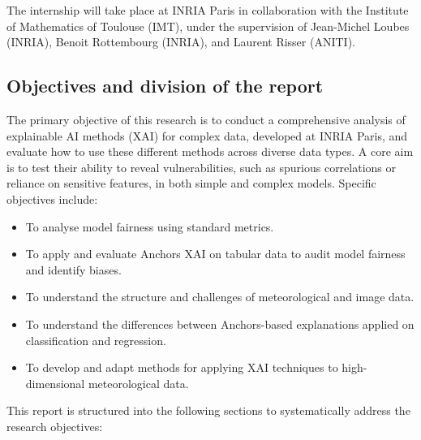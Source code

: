The internship will take place at INRIA Paris in collaboration with the Institute of Mathematics of Toulouse (IMT), under the supervision of Jean-Michel Loubes (INRIA), Benoit Rottembourg (INRIA), and Laurent Risser (ANITI).

\subsection{Objectives and division of the report}

The primary objective of this research is to conduct a comprehensive analysis of explainable AI methods (XAI) for complex data, developed at INRIA Paris, and evaluate how to use these different methods across diverse data types. A core aim is to test their ability to reveal vulnerabilities, such as spurious correlations or reliance on sensitive features, in both simple and complex models. Specific objectives include:

\begin{itemize}
    \item To analyse model fairness using standard metrics.
    \item To apply and evaluate Anchors XAI on tabular data to audit model fairness and identify biases.
    \item To understand the structure and challenges of meteorological and image data.
    \item To understand the differences between Anchors-based explanations applied on classification and regression.
    \item To develop and adapt methods for applying XAI techniques to high-dimensional meteorological data.
\end{itemize}

This report is structured into the following sections to systematically address the research objectives:

